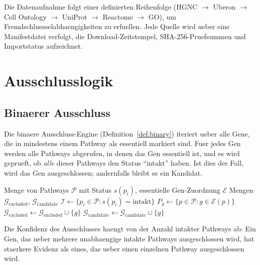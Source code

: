 \documentclass[12pt,a4paper]{article}
\begin{document}
Die Datenaufnahme folgt einer definierten Reihenfolge (HGNC $\to$ Uberon $\to$ Cell Ontology $\to$ UniProt $\to$ Reactome $\to$ GO), um Fremdschluesselabhaengigkeiten zu erfuellen. Jede Quelle wird ueber eine Manifestdatei verfolgt, die Download-Zeitstempel, SHA-256-Pruefsummen und Importstatus aufzeichnet.

\section{Ausschlusslogik}
\label{sec:exclusion}

\subsection{Binaerer Ausschluss}

Die binaere Ausschluss-Engine (Definition~\ref{def:binary}) iteriert ueber alle Gene, die in mindestens einem Pathway als essentiell markiert sind. Fuer jedes Gen werden alle Pathways abgerufen, in denen das Gen essentiell ist, und es wird geprueft, ob \emph{alle} dieser Pathways den Status "`intakt"' haben. Ist dies der Fall, wird das Gen ausgeschlossen; andernfalls bleibt es ein Kandidat.

\begin{algorithm}[H]
\caption{Binaere Ausschlussanalyse}
\label{alg:binary}
\begin{algorithmic}[1]
\Require Menge von Pathways $\mathcal{P}$ mit Status $s(p_i)$, essentielle Gen-Zuordnung $\mathcal{E}$
\Ensure Mengen $\mathcal{G}_{\text{excluded}}$, $\mathcal{G}_{\text{candidate}}$
\State $\mathcal{I} \gets \{p_i \in \mathcal{P} : s(p_i) = \text{intakt}\}$
 
    \State $P_g \gets \{p \in \mathcal{P} : g \in \mathcal{E}(p)\}$ 
        \State $\mathcal{G}_{\text{excluded}} \gets \mathcal{G}_{\text{excluded}} \cup \{g\}$
    \Else
        \State $\mathcal{G}_{\text{candidate}} \gets \mathcal{G}_{\text{candidate}} \cup \{g\}$
    \EndIf
\EndFor
\end{algorithmic}
\end{algorithm}

Die Konfidenz des Ausschlusses haengt von der Anzahl intakter Pathways ab: Ein Gen, das ueber mehrere unabhaengige intakte Pathways ausgeschlossen wird, hat staerkere Evidenz als eines, das ueber einen einzelnen Pathway ausgeschlossen wird.
\end{document}
